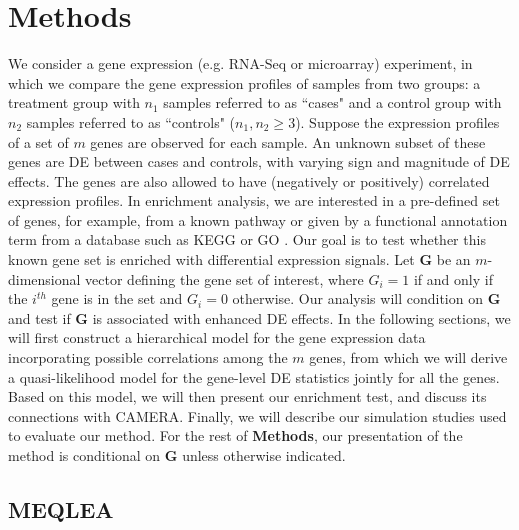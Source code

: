 \documentclass[useAMS,usenatbib, galley]{biom}
\newcommand{\OurMethod}{MEQLEA}
\begin{document}
	\section{Methods}\label{section:methods}
	We consider a gene expression (e.g. RNA-Seq or microarray) experiment, in which we compare the gene expression profiles of samples from two groups: a treatment group with $n_1$ samples referred to as ``cases" and a control group with $n_2$ samples referred to as ``controls" ($n_1,n_2\ge 3$). Suppose the expression profiles of a set of $m$ genes are observed for each sample. An unknown subset of these genes are DE between cases and controls, with varying sign and magnitude of DE effects. The genes are also allowed to have (negatively or positively) correlated expression profiles. In enrichment analysis, we are interested in a pre-defined set of genes, for example, from a known pathway or given by a functional annotation term from a database such as KEGG \citep{kanehisa2000kegg} or GO \citep{ashburner2000gene}. Our goal is to test whether this known gene set is enriched with differential expression signals. Let $\bm G$ be an $m$-dimensional vector defining the gene set of interest, where $G_i=1$ if and only if the $i^{th}$ gene is in the set and $G_i=0$ otherwise. Our analysis will condition on $\bm G$ and test if $\bm G$ is associated with enhanced DE effects. In the following sections, we will first construct a hierarchical model for the gene expression data incorporating possible correlations among the $m$ genes, from which we will derive a quasi-likelihood model for the gene-level DE statistics jointly for all the genes. Based on this model, we will then present our enrichment test, and discuss its connections with CAMERA. Finally, we will describe our simulation studies used to evaluate our method. For the rest of \textbf{Methods}, our presentation of the method is conditional on $\bm G$ unless otherwise indicated.
	
	\subsection{\OurMethod}
\end{document}
